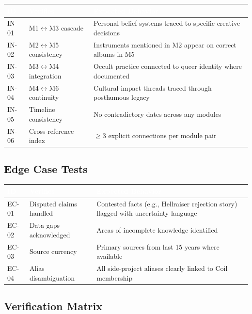 \documentclass[11pt,letterpaper]{article}
\newcommand{\tableheader}[1]{\textbf{\sffamily\textcolor{white}{#1}}}
\begin{document}
\begin{center}
\begin{tabularx}{\textwidth}{C{1.2cm}L{3.5cm}X}
\toprule
{}
\tableheader{ID} & \tableheader{Verifies} & \tableheader{Expected Behavior} \\
\midrule
IN-01 & M1$\leftrightarrow$M3 cascade & Personal belief systems traced to specific creative decisions \\
IN-02 & M2$\leftrightarrow$M5 consistency & Instruments mentioned in M2 appear on correct albums in M5 \\
IN-03 & M3$\leftrightarrow$M4 integration & Occult practice connected to queer identity where documented \\
IN-04 & M4$\leftrightarrow$M6 continuity & Cultural impact threads traced through posthumous legacy \\
IN-05 & Timeline consistency & No contradictory dates across any modules \\
IN-06 & Cross-reference index & $\geq$3 explicit connections per module pair \\
\bottomrule
\end{tabularx}
\end{center}

\subsection{Edge Case Tests}

\begin{center}
\begin{tabularx}{\textwidth}{C{1.2cm}L{3.5cm}X}
\toprule
{}
\tableheader{ID} & \tableheader{Verifies} & \tableheader{Expected Behavior} \\
\midrule
EC-01 & Disputed claims handled & Contested facts (e.g., Hellraiser rejection story) flagged with uncertainty language \\
EC-02 & Data gaps acknowledged & Areas of incomplete knowledge identified \\
EC-03 & Source currency & Primary sources from last 15 years where available \\
EC-04 & Alias disambiguation & All side-project aliases clearly linked to Coil membership \\
\bottomrule
\end{tabularx}
\end{center}

\subsection{Verification Matrix}
\end{document}
